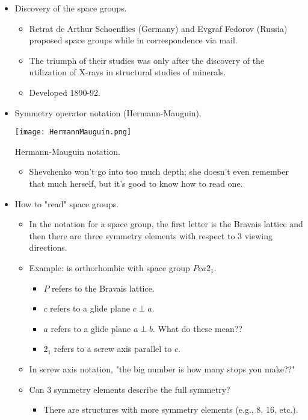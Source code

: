 \documentclass[../notes.tex]{subfiles}
\begin{document}
\begin{itemize}
    \item Discovery of the space groups.
    \begin{itemize}
        \item Retrat de Arthur Schoenflies (Germany) and Evgraf Fedorov (Russia) proposed space groups while in correspondence via mail.
        \item The triumph of their studies was only after the discovery of the utilization of X-rays in structural studies of minerals.
        \item Developed 1890-92.
    \end{itemize}
    \item Symmetry operator notation (Hermann-Mauguin).
    \begin{table}[H]
        \centering
        \texttt{[image: HermannMauguin.png]}
        \caption{Hermann-Mauguin notation.}
        \label{fig:HermannMauguin}
    \end{table}
    \begin{itemize}
        \item Shevchenko won't go into too much depth; she doesn't even remember that much herself, but it's good to know how to read one.
    \end{itemize}
    \item How to "read" space groups.
    \begin{itemize}
        \item In the notation for a space group, the first letter is the Bravais lattice and then there are three symmetry elements with respect to 3 viewing directions.
        \item Example:  is orthorhombic with space group $Pca2_1$.
        \begin{itemize}
            \item $P$ refers to the Bravais lattice.
            \item $c$ refers to a glide plane $c\perp a$.
            \item $a$ refers to a glide plane $a\perp b$. What do these mean??
            \item $2_1$ refers to a screw axis parallel to $c$.
        \end{itemize}
        \item In screw axis notation, "the big number is how many stops you make??"
        \item Can 3 symmetry elements describe the full symmetry?
        \begin{itemize}
            \item There are structures with more symmetry elements (e.g., 8, 16, etc.).

\end{itemize}
\end{itemize}
\end{itemize}
\end{document}
